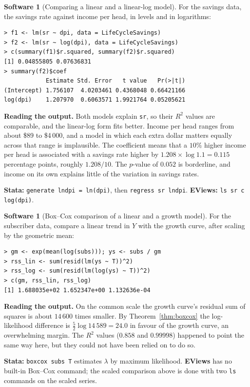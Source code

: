 \documentclass[11pt,a4paper]{article}
\numberwithin{equation}{section}
\theoremstyle{definition}
\newtheorem{software}[thm]{Software}
\begin{document}
\begin{software}[Comparing a linear and a linear-log model]
\label{sw:linlog}
For the savings data, the savings rate against income per head, in levels and in logarithms:
{\small\begin{verbatim}
> f1 <- lm(sr ~ dpi, data = LifeCycleSavings)
> f2 <- lm(sr ~ log(dpi), data = LifeCycleSavings)
> c(summary(f1)$r.squared, summary(f2)$r.squared)
[1] 0.04855805 0.07636831
> summary(f2)$coef
            Estimate Std. Error   t value   Pr(>|t|)
(Intercept) 1.756107  4.0203461 0.4368048 0.66421166
log(dpi)    1.207970  0.6063571 1.9921764 0.05205621
\end{verbatim}}
\textbf{Reading the output.} Both models explain \texttt{sr}, so their $R^2$ values are comparable, and the linear-log form fits better. Income per head
ranges from about \$89 to \$4\,000, and a model in which each extra dollar matters equally across that range is implausible. The coefficient means
that a $10\%$ higher income per head is associated with a savings rate higher by $1.208 \times \log 1.1 = 0.115$ percentage points, roughly
$1.208/10$. The $p$-value of $0.052$ is borderline, and income on its own explains little of the variation in savings rates.

\textbf{Stata:} \texttt{generate lndpi = ln(dpi)}, then \texttt{regress sr lndpi}. \textbf{EViews:} \texttt{ls sr c log(dpi)}.
\end{software}

\begin{software}[Box--Cox comparison of a linear and a growth model]
\label{sw:boxcox}
For the subscriber data, compare a linear trend in $Y$ with the growth curve, after scaling by the geometric mean:
{\small\begin{verbatim}
> gm <- exp(mean(log(subs))); ys <- subs / gm
> rss_lin <- sum(resid(lm(ys ~ T))^2)
> rss_log <- sum(resid(lm(log(ys) ~ T))^2)
> c(gm, rss_lin, rss_log)
[1] 1.688035e+02 1.652347e+00 1.132636e-04
\end{verbatim}}
\textbf{Reading the output.} On the common scale the growth curve's residual sum of squares is about $14\,600$ times smaller. By
Theorem~\ref{thm:boxcox} the log-likelihood difference is $\frac52\log 14\,589 = 24.0$ in favour of the growth curve, an overwhelming
margin. The $R^2$ values ($0.858$ and $0.99998$) happened to point the same way here, but they could not have been relied on to do so.

\textbf{Stata:} \texttt{boxcox subs T} estimates $\lambda$ by maximum likelihood. \textbf{EViews} has no built-in Box--Cox command; the scaled
comparison above is done with two \texttt{ls} commands on the scaled series.
\end{software}
\end{document}
